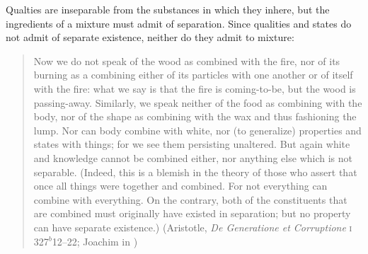 Qualties are inseparable from the substances in which they inhere, but the ingredients of a mixture must admit of separation. Since qualities and states do not admit of separate existence, neither do they admit to mixture:
\begin{quote}
	Now we do not speak of the wood as combined with the fire, nor of its burning as a combining either of its particles with one another or of itself with the fire: what we say is that the fire is coming-to-be, but the wood is passing-away. Similarly, we speak neither of the food as combining with the body, nor of the shape as combining with the wax and thus fashioning the lump. Nor can body combine with white, nor (to generalize) properties and states with things; for we see them persisting unaltered. But again white and knowledge cannot be combined either, nor anything else which is not separable. (Indeed, this is a blemish in the theory of those who assert that once all things were together and combined. For not everything can combine with everything. On the contrary, both of the constituents that are combined must originally have existed in separation; but no property can have separate existence.) (Aristotle, \emph{De Generatione et Corruptione} \textsc{i} 327\( ^{b} \)12--22; Joachim in \citealt[30--31]{Barnes:1984kx})
\end{quote}
